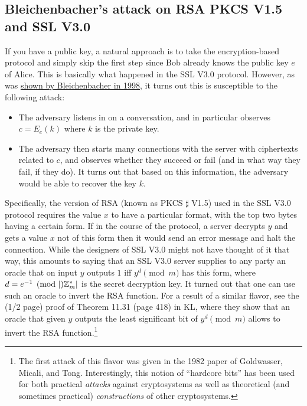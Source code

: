 \subsection{Bleichenbacher's attack on RSA PKCS V1.5 and SSL
V3.0}\label{14-Bleichenbachers-attack}

If you have a public key, a natural approach is to take the
encryption-based protocol and simply skip the first step since Bob
already knows the public key \(e\) of Alice. This is basically what
happened in the SSL V3.0 protocol. However, as was
\href{http://archiv.infsec.ethz.ch/education/fs08/secsem/bleichenbacher98.pdf}{shown
by Bleichenbacher in 1998}, it turns out this is susceptible to the
following attack:

\begin{itemize}
\item
  The adversary listens in on a conversation, and in particular observes
  \(c=E_e(k)\) where \(k\) is the private key.
\item
  The adversary then starts many connections with the server with
  ciphertexts related to \(c\), and observes whether they succeed or
  fail (and in what way they fail, if they do). It turns out that based
  on this information, the adversary would be able to recover the key
  \(k\).
\end{itemize}

Specifically, the version of RSA (known as PKCS \(\sharp\) V1.5) used in
the SSL V3.0 protocol requires the value \(x\) to have a particular
format, with the top two bytes having a certain form. If in the course
of the protocol, a server decrypts \(y\) and gets a value \(x\) not of
this form then it would send an error message and halt the connection.
While the designers of SSL V3.0 might not have thought of it that way,
this amounts to saying that an SSL V3.0 server supplies to any party an
oracle that on input \(y\) outputs \(1\) iff \(y^{d} \pmod{m}\) has this
form, where \(d = e^{-1} \pmod|{\mathbb{Z}}^*_m|\) is the secret decryption key.
It turned out that one can use such an oracle to invert the RSA
function. For a result of a similar flavor, see the (1/2 page) proof of
Theorem 11.31 (page 418) in KL, where they show that an oracle that
given \(y\) outputs the least significant bit of \(y^d \pmod{m}\) allows
to invert the RSA function.\footnote{The first attack of this flavor was
  given in the 1982 paper of Goldwasser, Micali, and Tong.
  Interestingly, this notion of ``hardcore bits'' has been used for both
  practical \emph{attacks} against cryptosystems as well as theoretical
  (and sometimes practical) \emph{constructions} of other cryptosystems.}


